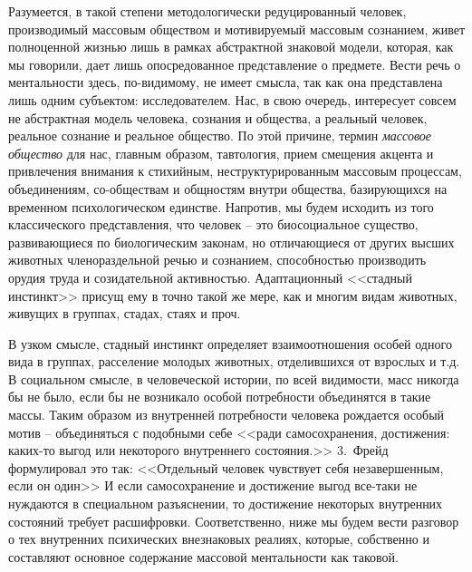 Разумеется, в такой степени методологически редуцированный человек, производимый массовым обществом и
мотивируемый массовым сознанием, живет полноценной жизнью лишь в рамках абстрактной знаковой модели,
которая, как мы говорили, дает лишь опосредованное представление о предмете. Вести речь о ментальности
здесь, по-видимому, не имеет смысла, так как она представлена лишь одним субъектом: исследователем.
Нас, в свою очередь, интересует совсем не абстрактная модель человека, сознания и общества, а реальный человек,
реальное сознание и реальное общество. По этой причине, термин \emph{массовое общество} для нас, главным образом,
тавтология, прием смещения акцента и привлечения внимания к стихийным, неструктурированным массовым процессам,
объединениям, со-обществам и общностям внутри общества, базирующихся на временном психологическом единстве.
Напротив, мы будем исходить из того классического представления, что человек -- это биосоциальное существо,
развивающиеся по биологическим законам, но отличающиеся от других высших животных членораздельной речью и
сознанием, способностью производить орудия труда и созидательной активностью. Адаптационный <<стадный инстинкт>>
присущ ему в точно такой же мере, как и многим видам животных, живущих в группах, стадах, стаях и проч.

В узком смысле, стадный инстинкт определяет взаимоотношения особей одного вида в группах, расселение молодых животных,
отделившихся от взрослых и т.д. В социальном смысле, в человеческой истории, по всей видимости, масс никогда бы не
было, если бы не возникало особой потребности объединятся в такие массы. Таким образом из внутренней потребности
человека рождается особый мотив -- объединяться с подобными себе <<ради самосохранения, достижения: каких-то выгод
или некоторого внутреннего состояния.>>\autocite{book:olshansky} 3.~Фрейд формулировал это так: <<Отдельный человек чувствует
себя незавершенным, если он один>>\autocite{freid_mass} И если самосохранение и достижение выгод все-таки не
нуждаются в специальном разъяснении, то достижение некоторых внутренних состояний требует расшифровки.
Соответственно, ниже мы будем вести разговор о тех внутренних психических внезнаковых реалиях, которые,
собственно и составляют основное содержание массовой ментальности как таковой.

